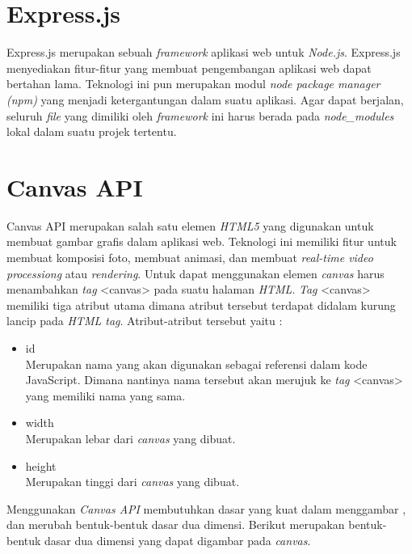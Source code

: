 \section{Express.js}
\label{sec:Express.js}

Express.js merupakan sebuah \textit{framework} aplikasi web untuk \textit{Node.js}. Express.js menyediakan fitur-fitur yang membuat pengembangan aplikasi web dapat bertahan lama. Teknologi ini pun merupakan modul \textit{node package manager (npm)} yang menjadi ketergantungan dalam suatu aplikasi. Agar dapat berjalan, seluruh \textit{file} yang dimiliki oleh \textit{framework} ini harus berada pada \textit{node\_modules} lokal dalam suatu projek tertentu. 


\section{Canvas API}
\label{sec:Canvas API}
 
Canvas API merupakan salah satu elemen \textit{HTML5} yang digunakan untuk membuat gambar grafis dalam aplikasi web. Teknologi ini memiliki fitur untuk membuat komposisi foto, membuat animasi, dan membuat \textit{real-time video processiong} atau \textit{rendering}. Untuk dapat menggunakan elemen \textit{canvas} harus menambahkan \textit{tag} <canvas> pada suatu halaman \textit{HTML}. \textit{Tag} <canvas> memiliki tiga atribut utama dimana atribut tersebut terdapat didalam kurung lancip pada \textit{HTML tag}. Atribut-atribut tersebut yaitu : 

\begin{itemize}
	\item id \\
	Merupakan nama yang akan digunakan sebagai referensi dalam kode JavaScript. Dimana nantinya nama tersebut akan merujuk ke \textit{tag} <canvas> yang memiliki nama yang sama.
	\item width \\
	Merupakan lebar dari \textit{canvas} yang dibuat.
	\item height \\
	Merupakan tinggi dari \textit{canvas} yang dibuat.
\end{itemize}

Menggunakan \textit{Canvas API} membutuhkan dasar yang kuat dalam menggambar , dan merubah bentuk-bentuk dasar dua dimensi. Berikut merupakan bentuk-bentuk dasar dua dimensi yang dapat digambar pada \textit{canvas}.

